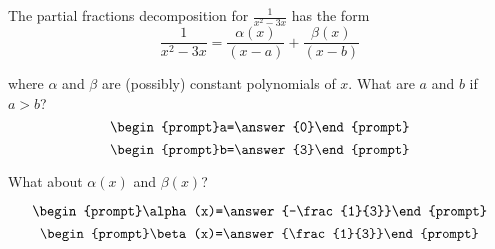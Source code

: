 \documentclass{ximera}
\author{Gregory Hartman \and Matthew Carr}
\begin{document}
\begin{exercise}




The partial fractions decomposition for $\frac{1}{x^2-3x}$ has the form 
\[
\frac{1}{x^2-3x}=\frac{\alpha(x)}{(x-a)}+\frac{\beta(x)}{(x-b)}
\]

where $\alpha$ and $\beta$ are (possibly) constant polynomials of $x$. What are $a$ and $b$ if $a>b$?
\[
\begin{prompt}a=\answer{0}\end{prompt}
\]
\[
\begin{prompt}b=\answer{3}\end{prompt}
\]

What about $\alpha(x)$ and $\beta(x)$? 

\[
\begin{prompt}\alpha(x)=\answer{-\frac{1}{3}}\end{prompt}
\]
\[
\begin{prompt}\beta(x)=\answer{\frac{1}{3}}\end{prompt}
\]


\end{exercise}
\end{document}
